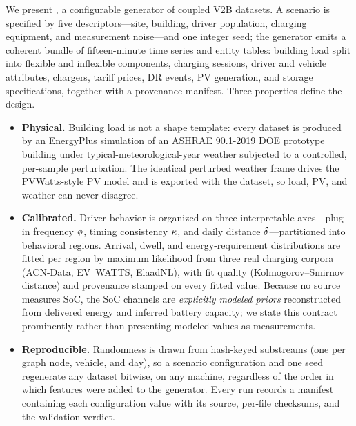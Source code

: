 We present \generator{}, a configurable generator of coupled V2B datasets. A
scenario is specified by five descriptors---site, building, driver population,
charging equipment, and measurement noise---and one integer seed; the
generator emits a coherent bundle of fifteen-minute time series and entity
tables: building load split into flexible and inflexible components, charging
sessions, driver and vehicle attributes, chargers, tariff prices, DR events,
PV generation, and storage specifications, together with a provenance
manifest. Three properties define the design.

\begin{itemize}
\item \textbf{Physical.} Building load is not a shape template: every dataset
is produced by an EnergyPlus \citep{crawley2001energyplus} simulation of an
ASHRAE 90.1-2019 DOE prototype building \citep{pnnl_prototypes} under
typical-meteorological-year weather subjected to a controlled, per-sample
perturbation. The identical perturbed weather frame drives the PVWatts-style
PV model \citep{dobos2014pvwatts} and is exported with the dataset, so load,
PV, and weather can never disagree.
\item \textbf{Calibrated.} Driver behavior is organized on three interpretable
axes---plug-in frequency $\phi$, timing consistency $\kappa$, and daily
distance $\delta$---partitioned into behavioral regions. Arrival, dwell, and
energy-requirement distributions are fitted per region by maximum likelihood
from three real charging corpora (ACN-Data, EV~WATTS, ElaadNL), with fit
quality (Kolmogorov--Smirnov distance) and provenance stamped on every fitted
value. Because no source measures SoC, the SoC channels are \emph{explicitly
modeled priors} reconstructed from delivered energy and inferred battery
capacity; we state this contract prominently rather than presenting modeled
values as measurements.
\item \textbf{Reproducible.} Randomness is drawn from hash-keyed substreams
(one per graph node, vehicle, and day), so a scenario configuration and one
seed regenerate any dataset bitwise, on any machine, regardless of the order
in which features were added to the generator. Every run records a manifest
containing each configuration value with its source, per-file checksums, and
the validation verdict.
\end{itemize}


